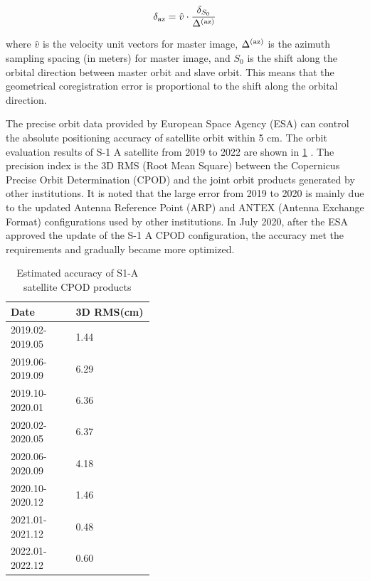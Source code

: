 \documentclass[a4paper,fleqn]{cas-sc}
\begin{document}
\begin{equation}
    \delta_{\rm az} = \hat{v} \cdot \frac{\delta_{S_0}}{\Delta^{({\rm az})}}
    \label{eq_8}
\end{equation}

\noindent where $\hat{v}$ is the velocity unit vectors for master image, $\Delta^{({\rm az})}$ is the azimuth sampling spacing (in meters) for master image, and $S_0$ is the shift along the orbital direction between master orbit and slave orbit. This means that the geometrical coregistration error is proportional to the shift along the orbital direction. \par
The precise orbit data provided by European Space Agency (ESA) can control the absolute positioning accuracy of satellite orbit within 5 cm. The orbit evaluation results of S-1 A satellite from 2019 to 2022 are shown in \ref{table_2} \cite{copernicus_review_2015.10-2019.09, copernicus_review_2019.10-2020.01, copernicus_review_2020.02-2020.05, copernicus_review_2020.06-2020.09, copernicus_review_2020.10-2020.12, copernicus_review_2021.01-2021.12, copernicus_review_2022.01-2022.12}. The precision index is the 3D RMS (Root Mean Square) between the Copernicus Precise Orbit Determination (CPOD) and the joint orbit products generated by other institutions. It is noted that the large error from 2019 to 2020 is mainly due to the updated Antenna Reference Point (ARP) and ANTEX (Antenna Exchange Format) configurations used by other institutions. In July 2020, after the ESA approved the update of the S-1 A CPOD configuration, the accuracy met the requirements and gradually became more optimized. \par

\begin{table}[htbp]
\caption{Estimated accuracy of S1-A satellite CPOD products}
\label{table_2}
\raggedright %
\begin{tabular}{p{0.2\linewidth}p{0.2\linewidth}}
\toprule
Date & 3D RMS(cm) \\ %
\midrule
2019.02-2019.05 & 1.44 \\
2019.06-2019.09 & 6.29 \\
2019.10-2020.01 & 6.36 \\
2020.02-2020.05 & 6.37 \\
2020.06-2020.09 & 4.18 \\
2020.10-2020.12 & 1.46 \\
2021.01-2021.12 & 0.48 \\
2022.01-2022.12 & 0.60 \\
\bottomrule
\end{tabular}
\end{table}
\end{document}
